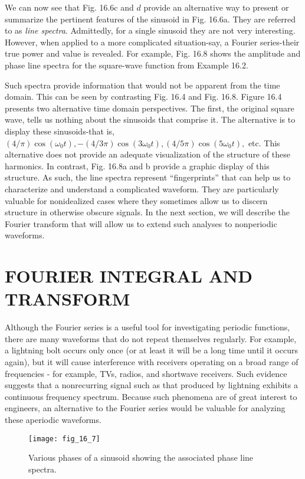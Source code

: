 \documentclass[../main.tex]{subfiles}
\begin{document}
We can now see that Fig. 16.6c and $d$ provide an alternative way to present or summarize the pertinent features of the sinusoid in Fig. 16.6a. They are referred to as \textit{line spectra}.
Admittedly, for a single sinusoid they are not very interesting. However, when applied to a
more complicated situation-say, a Fourier series-their true power and value is revealed.
For example, Fig. 16.8 shows the amplitude and phase line spectra for the square-wave
function from Example 16.2.

Such spectra provide information that would not be apparent from the time domain.
This can be seen by contrasting Fig. 16.4 and Fig. 16.8. Figure 16.4 presents two alternative time domain perspectives. The first, the original square wave, tells us nothing
about the sinusoids that comprise it. The alternative is to display these sinusoids-that
is, $(4 / \pi) \cos(\omega_0 t), -(4/3 \pi) \cos(3 \omega_0 t), (4/5 \pi) \cos(5 \omega_0t ),$ etc. This alternative does
not provide an adequate visualization of the structure of these harmonics. In contrast,
Fig. 16.8a and b provide a graphic display of this structure. As such, the line spectra
represent ``fingerprints'' that can help us to characterize and understand a complicated
waveform. They are particularly valuable for nonidealized cases where they sometimes
allow us to discern structure in otherwise obscure signals. In the next section, we will
describe the Fourier transform that will allow us to extend such analyses to nonperiodic
waveforms.

\label{cha:cha_P_16_4} %
\section{FOURIER INTEGRAL AND TRANSFORM}

\noindent Although the Fourier series is a useful tool for investigating periodic functions, there are
many waveforms that do not repeat themselves regularly. For example, a lightning bolt
occurs only once (or at least it will be a long time until it occurs again), but it will cause interference with receivers operating on a broad range of frequencies - for example, TVs,
radios, and shortwave receivers. Such evidence suggests that a nonrecurring signal such as
that produced by lightning exhibits a continuous frequency spectrum. Because such phenomena are of great interest to engineers, an alternative to the Fourier series would be valuable for analyzing these aperiodic waveforms.

\begin{figure}[H] 
	\centering
	\texttt{[image: fig\_16\_7]}
	\caption{\textsf{Various phases of a sinusoid showing the associated phase line spectra.}}
	\label{fig:fig_16_7}
\end{figure}
\end{document}
